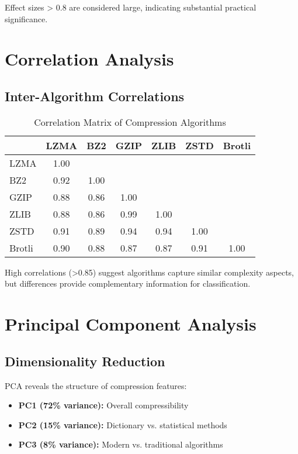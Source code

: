 \documentclass[12pt,a4paper]{report}
\begin{document}
Effect sizes > 0.8 are considered large, indicating substantial practical significance.

\section{Correlation Analysis}

\subsection{Inter-Algorithm Correlations}

\begin{table}[h]
\centering
\caption{Correlation Matrix of Compression Algorithms}
\begin{tabular}{lcccccc}
\toprule
 & LZMA & BZ2 & GZIP & ZLIB & ZSTD & Brotli \\
\midrule
LZMA & 1.00 & & & & & \\
BZ2 & 0.92 & 1.00 & & & & \\
GZIP & 0.88 & 0.86 & 1.00 & & & \\
ZLIB & 0.88 & 0.86 & 0.99 & 1.00 & & \\
ZSTD & 0.91 & 0.89 & 0.94 & 0.94 & 1.00 & \\
Brotli & 0.90 & 0.88 & 0.87 & 0.87 & 0.91 & 1.00 \\
\bottomrule
\end{tabular}
\end{table}

High correlations (>0.85) suggest algorithms capture similar complexity aspects, but differences provide complementary information for classification.

\section{Principal Component Analysis}

\subsection{Dimensionality Reduction}

PCA reveals the structure of compression features:

\begin{itemize}
    \item \textbf{PC1 (72\% variance):} Overall compressibility
    \item \textbf{PC2 (15\% variance):} Dictionary vs. statistical methods
    \item \textbf{PC3 (8\% variance):} Modern vs. traditional algorithms
\end{itemize}
\end{document}
